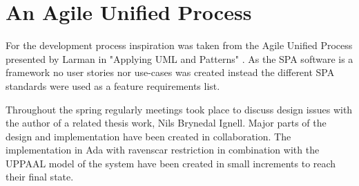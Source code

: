 \section{An Agile Unified Process}
For the development process inspiration was taken from the Agile Unified
Process presented by Larman in "Applying UML and Patterns" \cite{larman2005}.
As the SPA software is a framework no user stories nor use-cases was created
instead the different SPA standards were used as a feature requirements list.

Throughout the spring regularly meetings took place to discuss design issues
with the author of a related thesis work, Nils Brynedal Ignell. Major parts of
the design and implementation have been created in collaboration. The
implementation in Ada with ravenscar restriction in combination with the UPPAAL
model of the system have been created in small increments to reach their final
state.
